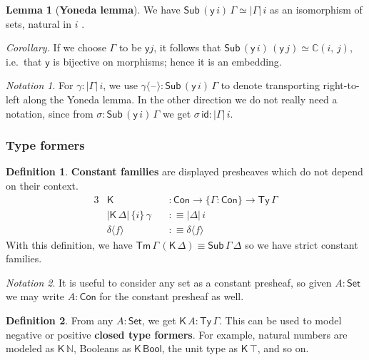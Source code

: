\documentclass[12pt,a4paper,twoside,openany]{book}
\theoremstyle{remark}
\newtheorem{notation}{Notation}
\theoremstyle{definition}
\newtheorem{mydefinition}{Definition}
\newtheorem{mylemma}{Lemma}
\theoremstyle{theorem}
\newcommand{\ms}[1]{\mathsf{#1}}
\newcommand{\mbb}[1]{\mathbb{#1}}
\newcommand{\id}{\mathsf{id}}
\newcommand{\Con}{\mathsf{Con}}
\newcommand{\Sub}{\mathsf{Sub}}
\newcommand{\Tm}{\mathsf{Tm}}
\newcommand{\Ty}{\mathsf{Ty}}
\newcommand{\blank}{\mathord{\hspace{1pt}\text{--}\hspace{1pt}}}
\newcommand{\Set}{\mathsf{Set}}
\newcommand{\K}{\mathsf{K}}
\newcommand{\Bool}{\ms{Bool}}
\newcommand{\mbbC}{\mbb{C}}
\newcommand{\lab}{\langle}
\newcommand{\rab}{\rangle}
\newcommand{\defn}{:\equiv}
\newcommand{\yon}{\ms{y}}
\begin{document}
\begin{mylemma}[\textbf{Yoneda lemma}] We have $\Sub\,(\yon\,i)\,\Gamma \simeq |\Gamma|\,i$ as an isomorphism of sets, natural in $i$ \cite[Section~III.2]{maclane98categories}.
\end{mylemma}

\noindent\emph{Corollary.} If we choose $\Gamma$ to be $\yon j$, it follows that
$\Sub\,(\yon\,i)\,(\yon\,j) \simeq \mbbC(i,\,j)$, i.e.\ that $\yon$ is
bijective on morphisms; hence it is an embedding.

\begin{notation}
\label{not:yoneda}
For $\gamma : |\Gamma|\,i$, we use $\gamma\lab \blank \rab :
\Sub\,(\yon\,i)\,\Gamma $ to denote transporting right-to-left along the Yoneda
lemma. In the other direction we do not really need a notation, since from
$\sigma : \Sub\,(\yon\,i)\,\Gamma$ we get $\sigma\,\id : |\Gamma|\,i$.
\end{notation}

\subsubsection{Type formers}

\begin{mydefinition}
\label{def:k-psh}
\textbf{Constant families} are displayed presheaves which do not depend on their context.
\begin{alignat*}{3}
  & \K &&: \Con \to \{\Gamma : \Con \} \to \Ty\,\Gamma\\
  & |\K\,\Delta|\,\{i\}\,\gamma\,&&\defn |\Delta|\,i \\
  & \delta\lab f \rab &&\defn \delta \lab f \rab
\end{alignat*}
With this definition, we have $\Tm\,\Gamma\,(\K\,\Delta) \equiv \Sub\,\Gamma\,\Delta$
so we have strict constant families.
\end{mydefinition}

\begin{notation}
It is useful to consider any set as a constant presheaf, so
given $A : \Set$ we may write $A : \Con$ for the constant presheaf
as well.
\end{notation}

\begin{mydefinition}
From any $A : \Set$, we get $\K\,A : \Ty\,\Gamma$. This can be used to
model negative or positive \textbf{closed type formers}. For example, natural
numbers are modeled as $\K\,\mbb{N}$, Booleans as $\K\,\Bool$, the unit type as
$\K\,\top$, and so on.
\end{mydefinition}
\end{document}
